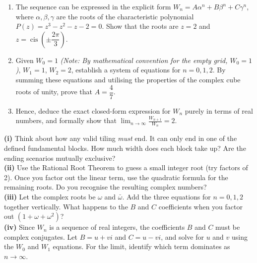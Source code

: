 \begin{problem}
\begin{enumerate}
    \item[(ii)] The sequence can be expressed in the explicit form $W_n = A\alpha^n + B\beta^n + C\gamma^n$, where $\alpha, \beta, \gamma$ are the roots of the characteristic polynomial $P(z) = z^3 - z^2 - z - 2 = 0$.
    Show that the roots are $z = 2$ and $z = \operatorname{cis}\!\left(\pm \dfrac{2\pi}{3}\right)$.

    \item[(iii)] Given $W_0 = 1$ \textit{(Note: By mathematical convention for the empty grid, $W_0 = 1$)}, $W_1 = 1$, $W_2 = 2$, establish a system of equations for $n = 0, 1, 2$. By summing these equations and utilising the properties of the complex cube roots of unity, prove that $A = \dfrac{4}{7}$.

    \item[(iv)] Hence, deduce the exact closed-form expression for $W_n$ purely in terms of real numbers, and formally show that $\displaystyle\lim_{n \to \infty} \frac{W_{n+1}}{W_n} = 2$.
\end{enumerate}
\end{problem}

\begin{hint}
\textbf{(i)} Think about how any valid tiling \emph{must} end. It can only end in one of the defined fundamental blocks. How much width does each block take up? Are the ending scenarios mutually exclusive?\\[4pt]
\textbf{(ii)} Use the Rational Root Theorem to guess a small integer root (try factors of 2). Once you factor out the linear term, use the quadratic formula for the remaining roots. Do you recognise the resulting complex numbers?\\[4pt]
\textbf{(iii)} Let the complex roots be $\omega$ and $\bar{\omega}$. Add the three equations for $n=0,1,2$ together vertically. What happens to the $B$ and $C$ coefficients when you factor out $(1 + \omega + \omega^2)$?\\[4pt]
\textbf{(iv)} Since $W_n$ is a sequence of real integers, the coefficients $B$ and $C$ must be complex conjugates. Let $B = u + vi$ and $C = u - vi$, and solve for $u$ and $v$ using the $W_0$ and $W_1$ equations. For the limit, identify which term dominates as $n \to \infty$.
\end{hint}

